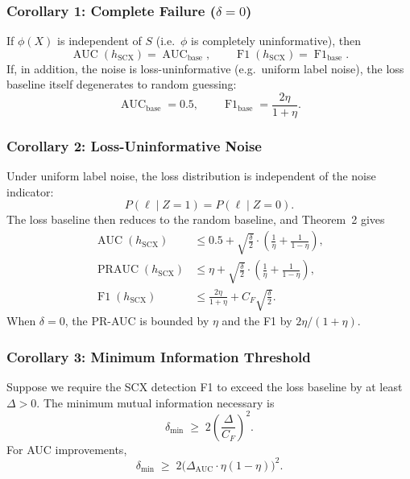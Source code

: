 \subsubsection*{Corollary 1: Complete Failure ($\delta = 0$)}
\label{cor:complete-failure}
If $\phi(X)$ is independent of $S$ (i.e.\ $\phi$ is completely uninformative),
then
\[
\operatorname{AUC}(h_{\text{SCX}}) = \operatorname{AUC}_{\text{base}},\qquad
\operatorname{F1}(h_{\text{SCX}}) = \operatorname{F1}_{\text{base}}.
\]
If, in addition, the noise is loss-uninformative (e.g.\ uniform label noise),
the loss baseline itself degenerates to random guessing:
\[
\operatorname{AUC}_{\text{base}} = 0.5,\qquad
\operatorname{F1}_{\text{base}} = \frac{2\eta}{1+\eta}.
\]

\subsubsection*{Corollary 2: Loss-Uninformative Noise}
\label{cor:loss-uninformative}
Under uniform label noise, the loss distribution is independent of the noise
indicator:
\[
P(\ell \mid Z=1) = P(\ell \mid Z=0).
\]
The loss baseline then reduces to the random baseline, and Theorem~2 gives
\begin{align}
\operatorname{AUC}(h_{\text{SCX}}) &\leq 0.5 +
\sqrt{\frac{\delta}{2}}\cdot\left(\frac{1}{\eta} + \frac{1}{1-\eta}\right),
\label{eq:cor2-auc} \\
\operatorname{PRAUC}(h_{\text{SCX}}) &\leq \eta +
\sqrt{\frac{\delta}{2}}\cdot\left(\frac{1}{\eta} + \frac{1}{1-\eta}\right),
\label{eq:cor2-prauc} \\
\operatorname{F1}(h_{\text{SCX}}) &\leq \frac{2\eta}{1+\eta} +
C_F\sqrt{\frac{\delta}{2}}.
\label{eq:cor2-f1}
\end{align}
When $\delta = 0$, the PR-AUC is bounded by $\eta$ and the F1 by
$2\eta/(1+\eta)$.

\subsubsection*{Corollary 3: Minimum Information Threshold}
\label{cor:min-info}
Suppose we require the SCX detection F1 to exceed the loss baseline by at
least $\Delta > 0$. The minimum mutual information necessary is
\begin{equation}
\delta_{\min} \;\geq\; 2\left(\frac{\Delta}{C_F}\right)^2.
\label{eq:min-info-f1}
\end{equation}
For AUC improvements,
\begin{equation}
\delta_{\min} \;\geq\; 2\bigl(\Delta_{\text{AUC}} \cdot \eta(1-\eta)\bigr)^2.
\label{eq:min-info-auc}
\end{equation}

